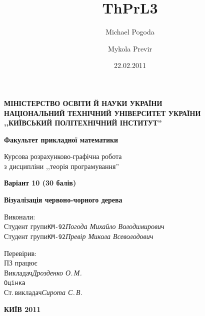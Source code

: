 \documentclass[a4paper,10pt,notitlepage,pdftex,headsepline]{scrartcl}
\author{Michael Pogoda \and Mykola Previr}
\title{ThPrL3}
\date{22.02.2011}
\begin{document}
\thispagestyle{empty}
\begin{center}
\textbf{\Large
\MakeUppercase{Міністерство освіти й науки України}\\
\MakeUppercase{Національний технічний університет України}\\
\MakeUppercase{,,Київський політехнічний інститут''}\\
}

\vspace{2cm}

\textbf{\large
Факультет прикладної математики
}\\

\vspace{3cm}

Курсова розрахунково-графічна робота\\

з дисципліни ,,теорія програмування''

\textbf{Варіант 10 (30 балів)}

\textbf{Візуалізація червоно-чорного дерева}
\end{center}

Виконали:\\
Студент групи\hfill\texttt{КМ-92}\hspace{1cm}\textit{Погода Михайло Володимирович}\hspace{3.5cm}\\
Студент групи\hfill\texttt{КМ-92}\hspace{1cm}\textit{Превір Микола Всеволодович}\hspace{3.5cm}\\

\vspace{1cm}

Перевірив:\\
ПЗ працює\\
Викладач\hfill\textit{Дрозденко О.\,М.}\hfill\underline{\hspace{2cm}}\hspace{0.5cm}\underline{\hspace{2cm}}\\
\texttt{Оцінка}~\underline{\hspace{2cm}}\\
Ст.\,викладач\hfill\textit{Сирота С.\,В.}\hfill\underline{\hspace{2cm}}\hspace{0.5cm}\underline{\hspace{2cm}}

\vfill
\begin{center}

\Large
\bf
КИЇВ 2011

\end{center}
\end{document}
